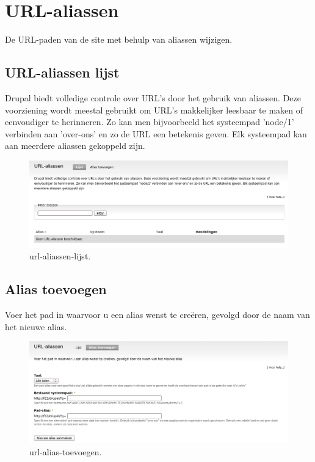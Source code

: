 \section{URL-aliassen} 
De URL-paden van de site met behulp van aliassen wijzigen.

\subsection{URL-aliassen lijst}
Drupal biedt volledige controle over URL's door het gebruik van aliassen. 
Deze voorziening wordt meestal gebruikt om URL's makkelijker leesbaar te maken 
of eenvoudiger te herinneren. Zo kan men bijvoorbeeld het systeempad 'node/1' verbinden aan 'over-ons' en 
zo de URL een betekenis geven. Elk systeempad kan aan meerdere aliassen gekoppeld zijn.
 \begin{figure}[!h]
    \centering
   \includegraphics[scale=0.3,angle=0]{url-aliassen-lijst}
   \caption{url-aliassen-lijst.\label{white}}
 \end{figure}
 
\subsection{Alias toevoegen}
 Voer het pad in waarvoor u een alias wenst te cre\"eren, gevolgd door de naam
 van het nieuwe alias.
 \begin{figure}[!h]
    \centering
   \includegraphics[scale=0.3,angle=0]{url-alias-toevoegen}
   \caption{url-alias-toevoegen.\label{white}}
 \end{figure}
 
